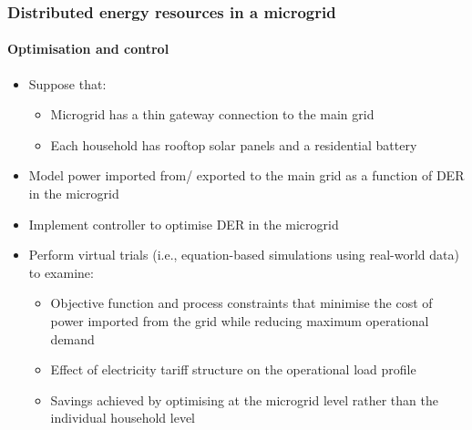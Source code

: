 \documentclass[handout, smaller, xcolor=table]{beamer}			%
\begin{document}
\begin{frame}
	\frametitle{Distributed energy resources in a microgrid}
	\framesubtitle{Optimisation and control}

	\begin{itemize}
		\item  Suppose that:
		\begin{itemize}
			\item  Microgrid has a thin gateway connection to the main grid
			\item  Each household has rooftop solar panels and a residential battery
		\end{itemize}
		
		\item  Model power imported from/ exported to the main grid as a function of DER in the microgrid
		
		\item  Implement controller to optimise DER in the microgrid
		
		\item  Perform virtual trials (i.e., equation-based simulations using real-world data) to examine:%
		\begin{itemize}
			\item  Objective function and process constraints that minimise the cost of power imported from the grid while reducing maximum operational demand
			\item  Effect of electricity tariff structure on the operational load profile
			\item  Savings achieved by optimising at the microgrid level rather than the individual household level
		\end{itemize}
	
	\end{itemize}

\end{frame}
\end{document}
